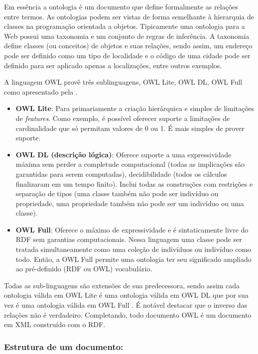 Em essência a ontologia é um documento que define formalmente as relações entre termos. As ontologias podem ser vistas de forma semelhante à hierarquia de classes na programação orientada a objetos. Tipicamente uma ontologia para a Web possui uma taxonomia e um conjunto de regras de inferência. A taxonomia define classes (ou conceitos) de objetos e suas relações, sendo assim, um endereço pode ser definido como um tipo de localidade e o código de uma cidade pode ser definido para ser aplicado apenas a localizações, entre outros exemplos.

A linguagem OWL provê três sublinguagens, OWL Lite, OWL DL, OWL Full como apresentado pela \cite{OWLW3C}.

\begin{itemize}
	\item{\textbf{OWL Lite}: Para primariamente a criação hierárquica e simples de limitações de \textit{features}. Como exemplo, é possível oferecer suporte a limitações de cardinalidade que só permitam valores de 0 ou 1. É mais simples de prover suporte.} 

	\item{\textbf{OWL DL (descrição lógica)}: Oferece suporte a uma expressividade máxima sem perder a completude computacional (todas as implicações são garantidas para serem computadas), decidibilidade (todos os cálculos finalizaram em um tempo finito). Inclui todas as construções com restrições e separação de tipos (uma classe também não pode ser indivíduo ou propriedade, uma propriedade também não pode ser um indivíduo ou uma classe).}

	\item{\textbf{OWL Full}: Oferece o máximo de expressividade e é sintaticamente livre do RDF sem garantias computacionais. Nessa linguagem uma classe pode ser tratada simultaneamente como uma coleção de indivíduos ou indivíduo como todo. Então, a OWL Full permite uma ontologia ter seu significado ampliado ao pré-definido (RDF ou OWL) vocabulário.}
\end{itemize}

Todas as sub-linguagens são extensões de sua predecessora, sendo assim cada ontologia válida em OWL Lite é uma ontologia válida em OWL DL que por sua vez é uma ontologia válida em OWL Full \citep{ OWLW3C}. É notável destacar que o inverso das relações não é verdadeiro. Completando, todo documento OWL é um documento em XML construído com o RDF.

\subsubsection{Estrutura de um documento:}

